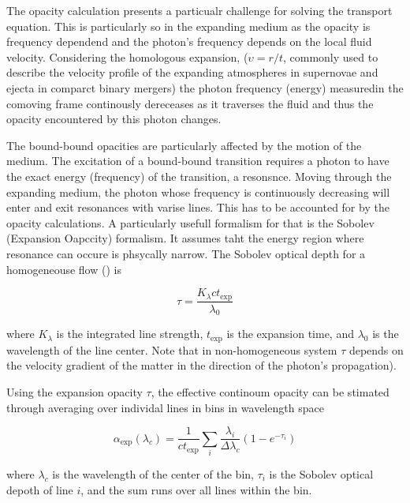\documentclass[11pt,a4paper,headinclude=true,DIV=14,BCOR=8mm,chapterprefix,listof=totoc,twoside,openright,abstracton]{scrbook}
\begin{document}
The opacity calculation presents a particualr challenge for solving the transport equation. This is particularly so in the expanding medium as the opacity is frequency dependend and the photon's frequency depends on the local fluid velocity. 
Considering the homologous expansion, ($\upsilon = r/t$, commonly used to describe the velocity profile of the expanding atmospheres in supernovae and ejecta in comparct binary mergers) the photon frequency (energy) measuredin the comoving frame continously dereceases as it traverses the fluid and thus the opacity encountered by this photon changes. 

The bound-bound opacities are particularly affected by the motion of the medium. The excitation of a bound-bound transition requires a photon to have the exact energy (frequency) of the transition, a resonsnce. Moving through the expanding medium, the photon whose frequency is continuously decreasing will enter and exit resonances with varise lines. This has to be accounted for by the opacity calculations. A particularly usefull formalism for that is the Sobolev (Expansion Oapccity) formalism. It assumes taht the energy region where resonance can occure is phsycally narrow. The Sobolev optical depth for a homogeneouse flow (\cite{Sobolev 1960}) is 

\begin{equation}
    \tau = \frac{K_{\lambda} c t_{\text{exp}}}{\lambda_0}
\end{equation}

where $K_{\lambda}$ is the integrated line strength, $t_{\text{exp}}$ is the expansion time, and $\lambda_0$ is the wavelength of the line center.
Note that in non-homogeneous system $\tau$ depends on the velocity gradient of the matter in the direction of the photon's propagation).

Using the expansion opacity $\tau$, the effective continoum opacity can be stimated through averaging over individal lines in bins in wavelength space \cite{Karp et al. (1977), Eastman & Pinto 1993,}

\begin{equation}
    \alpha_{\text{exp}}(\lambda_c) = \frac{1}{ct_{\text{exp}}} \sum_i \frac{\lambda_i}{\Delta \lambda_c} (1 - e^{-\tau_i})
\end{equation}

where $\lambda_c$ is the wavelength of the center of the bin, $\tau_i$ is the Sobolev optical depoth of line $i$, and the sum runs over all lines within the bin. 

\end{document}
